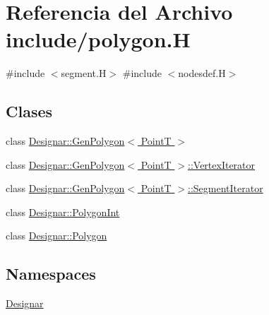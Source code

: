 \hypertarget{polygon_8_h}{}\section{Referencia del Archivo include/polygon.H}
\label{polygon_8_h}
{\ttfamily \#include $<$segment.\+H$>$}\newline
{\ttfamily \#include $<$nodesdef.\+H$>$}\newline
\subsection*{Clases}
\begin{DoxyCompactItemize}
\item 
class \hyperlink{class_designar_1_1_gen_polygon}{Designar\+::\+Gen\+Polygon$<$ Point\+T $>$}
\item 
class \hyperlink{class_designar_1_1_gen_polygon_1_1_vertex_iterator}{Designar\+::\+Gen\+Polygon$<$ Point\+T $>$\+::\+Vertex\+Iterator}
\item 
class \hyperlink{class_designar_1_1_gen_polygon_1_1_segment_iterator}{Designar\+::\+Gen\+Polygon$<$ Point\+T $>$\+::\+Segment\+Iterator}
\item 
class \hyperlink{class_designar_1_1_polygon_int}{Designar\+::\+Polygon\+Int}
\item 
class \hyperlink{class_designar_1_1_polygon}{Designar\+::\+Polygon}
\end{DoxyCompactItemize}
\subsection*{Namespaces}
\begin{DoxyCompactItemize}
\item 
 \hyperlink{namespace_designar}{Designar}
\end{DoxyCompactItemize}

